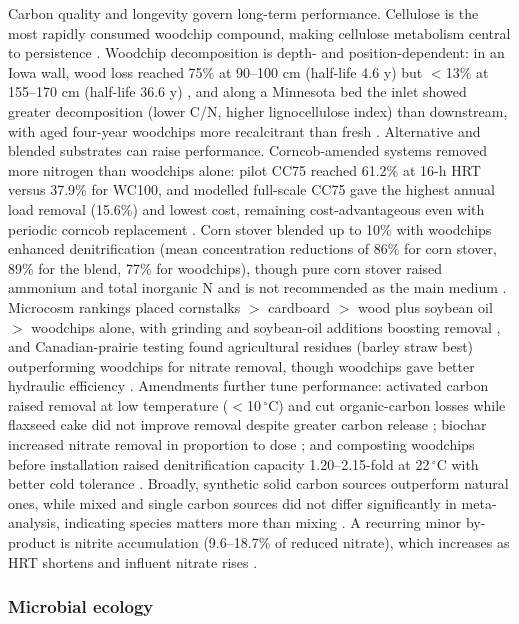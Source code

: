 Carbon quality and longevity govern long-term performance. Cellulose is the most rapidly consumed woodchip compound, making cellulose metabolism central to persistence \parencite{Hartfiel2022}. Woodchip decomposition is depth- and position-dependent: in an Iowa wall, wood loss reached 75\% at 90--100 cm (half-life 4.6 y) but $<$13\% at 155--170 cm (half-life 36.6 y) \parencite{Moorman2010}, and along a Minnesota bed the inlet showed greater decomposition (lower C/N, higher lignocellulose index) than downstream, with aged four-year woodchips more recalcitrant than fresh \parencite{Ghane2018}. Alternative and blended substrates can raise performance. Corncob-amended systems removed more nitrogen than woodchips alone: pilot CC75 reached 61.2\% at 16-h HRT versus 37.9\% for WC100, and modelled full-scale CC75 gave the highest annual load removal (15.6\%) and lowest cost, remaining cost-advantageous even with periodic corncob replacement \parencite{Law2023}. Corn stover blended up to 10\% with woodchips enhanced denitrification (mean concentration reductions of 86\% for corn stover, 89\% for the blend, 77\% for woodchips), though pure corn stover raised ammonium and total inorganic N and is not recommended as the main medium \parencite{Oladeji2023}. Microcosm rankings placed cornstalks $>$ cardboard $>$ wood plus soybean oil $>$ woodchips alone, with grinding and soybean-oil additions boosting removal \parencite{Greenan2006}, and Canadian-prairie testing found agricultural residues (barley straw best) outperforming woodchips for nitrate removal, though woodchips gave better hydraulic efficiency \parencite{Kohn2023}. Amendments further tune performance: activated carbon raised removal at low temperature ($<$10\,$^{\circ}$C) and cut organic-carbon losses while flaxseed cake did not improve removal despite greater carbon release \parencite{Povilaitis2020}; biochar increased nitrate removal in proportion to dose \parencite{Ahmadvand2020}; and composting woodchips before installation raised denitrification capacity 1.20--2.15-fold at 22\,$^{\circ}$C with better cold tolerance \parencite{Kouanda2021}. Broadly, synthetic solid carbon sources outperform natural ones, while mixed and single carbon sources did not differ significantly in meta-analysis, indicating species matters more than mixing \parencite{Zhang2021b}. A recurring minor by-product is nitrite accumulation (9.6--18.7\% of reduced nitrate), which increases as HRT shortens and influent nitrate rises \parencite{Hua2016,Kouanda2021}.

\subsubsection{Microbial ecology}


